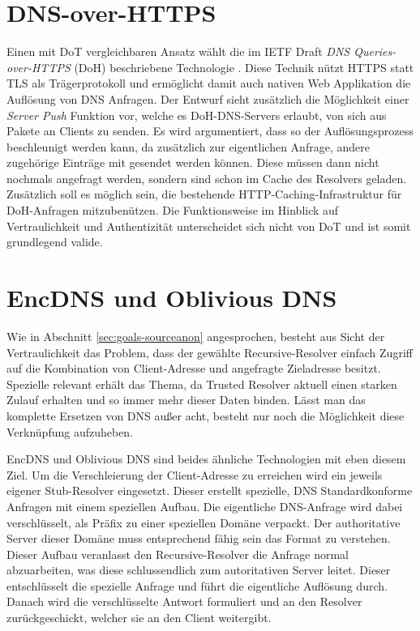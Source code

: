\section{DNS-over-HTTPS}
Einen mit DoT vergleichbaren Ansatz wählt die im IETF Draft \textit{DNS Queries-over-HTTPS} (DoH) beschriebene Technologie \cite{Mcmanus2018}. Diese Technik nützt HTTPS statt TLS als Trägerprotokoll und ermöglicht damit auch nativen Web Applikation die Auflösung von DNS Anfragen. Der Entwurf sieht zusätzlich die Möglichkeit einer \textit{Server Push} Funktion vor, welche es DoH-DNS-Servers erlaubt, von sich aus Pakete an Clients zu senden. Es wird argumentiert, dass so der Auflösungsprozess beschleunigt werden kann, da zusätzlich zur eigentlichen Anfrage, andere zugehörige Einträge mit gesendet werden können. Diese müssen dann nicht nochmals angefragt werden, sondern sind schon im Cache des Resolvers geladen. Zusätzlich soll es möglich sein, die bestehende HTTP-Caching-Infrastruktur für DoH-Anfragen mitzubenützen. Die Funktionsweise im Hinblick auf Vertraulichkeit und Authentizität unterscheidet sich nicht von DoT und ist somit grundlegend valide. 

\section{EncDNS und Oblivious DNS}
\label{tec:encdns-odns}
Wie in Abschnitt \ref{sec:goals-sourceanon} angesprochen, besteht aus Sicht der Vertraulichkeit das Problem, dass der gewählte Recursive-Resolver einfach Zugriff auf die Kombination von Client-Adresse und angefragte Zieladresse besitzt. Spezielle relevant erhält das Thema, da Trusted Resolver aktuell einen starken Zulauf erhalten und so immer mehr dieser Daten binden. Lässt man das komplette Ersetzen von DNS außer acht, besteht nur noch die Möglichkeit diese Verknüpfung aufzuheben. 

EncDNS\cite{Herrmann2014} und Oblivious DNS\cite{Schmitt2018} sind beides ähnliche Technologien mit eben diesem Ziel. Um die Verschleierung der Client-Adresse zu erreichen wird ein jeweils eigener Stub-Resolver eingesetzt. Dieser erstellt spezielle, DNS Standardkonforme Anfragen mit einem speziellen Aufbau. Die eigentliche DNS-Anfrage wird dabei verschlüsselt, als Präfix zu einer speziellen Domäne verpackt. Der authoritative Server dieser Domäne muss entsprechend fähig sein das Format zu verstehen. Dieser Aufbau veranlasst den Recursive-Resolver die Anfrage normal abzuarbeiten, was diese schlussendlich zum autoritativen Server leitet. Dieser entschlüsselt die spezielle Anfrage und führt die eigentliche Auflösung durch. Danach wird die verschlüsselte Antwort formuliert und an den Resolver zurückgeschickt, welcher sie an den Client weitergibt.

